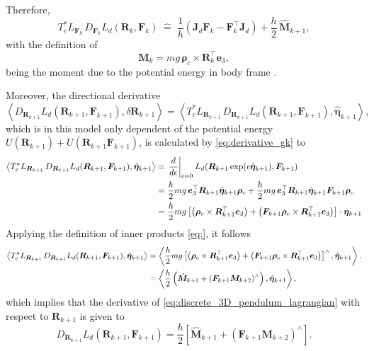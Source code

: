 Therefore,
\begin{equation}\label{eq:discrete_3D_pendulum_derivative_fk}
    T_e^*L_{\bm{F}_k}\,D_{\bm{F}_k}L_d(\bm{R}_k,\bm{F}_k)
    \;\widehat{=}\;
    \frac{1}{h}\left(\bm{J}_d \bm{F}_k - \bm{F}_k^{\top}\bm{J}_d\right)
    +
    \frac{h}{2}\,\hat{\bm{M}}_{k+1},
\end{equation}
    with the definition of
\begin{equation}
    \bm{M}_{k} = mg\,\bm{\rho}_c\times \bm{R}_{k}^{\top}\bm{e}_3,
\end{equation}
being the moment due to the potential energy in body frame \cite{Lee2008}.

Moreover, the directional derivative 
\[
\left\langle
D_{\bm{R}_{k+1}}L_d(\bm{R}_{k+1},\bm{F}_{k+1}),
\delta \bm{R}_{k+1}
\right\rangle = \left\langle
T_e^*L_{\bm{R}_{k+1}}\,D_{\bm{R}_{k+1}}L_d(\bm{R}_{k+1},\bm{F}_{k+1}),
\hat{\bm{\eta}}_{k+1}
\right\rangle,
\] which is in this model only dependent of the potential energy $U(\bm{R}_{k+1})+U(\bm{R}_{k+1} \bm{F}_{k+1})$, is calculated by \eqref{eq:derivative_gk} to
{\small
\begin{align}
\left\langle
T_e^*L_{\bm{R}_{k+1}}\,D_{\bm{R}_{k+1}}L_d(\bm{R}_{k+1},\bm{F}_{k+1}),
\hat{\bm{\eta}}_{k+1}
\right\rangle
\notag
&=
\left.\frac{d}{d\epsilon}\right|_{\epsilon=0}
L_d\!\left(
\bm{R}_{k+1}\exp(\epsilon\hat{\bm{\eta}}_{k+1}),
\bm{F}_{k+1}
\right)
\notag\\
&=
\frac{h}{2}mg\,\bm{e}_3^{\top}\bm{R}_{k+1}\hat{\bm{\eta}}_{k+1}\bm{\rho}_c
+
\frac{h}{2}mg\,\bm{e}_3^{\top}\bm{R}_{k+1}\hat{\bm{\eta}}_{k+1}\bm{F}_{k+1}\bm{\rho}_c
\notag\\
&=
\frac{h}{2}mg
\left[
\left(\bm{\rho}_c\times \bm{R}_{k+1}^{\top}\bm{e}_3\right)
+
\left(\bm{F}_{k+1}\bm{\rho}_c\times \bm{R}_{k+1}^{\top}\bm{e}_3\right)
\right]\cdot \bm{\eta}_{k+1}
\notag
\end{align}}
Applying the definition of inner products \eqref{eq:}, it follows 
{\small
\begin{align}  
 \left\langle
T_e^*L_{\bm{R}_{k+1}}\,D_{\bm{R}_{k+1}}L_d(\bm{R}_{k+1},\bm{F}_{k+1}),
\hat{\bm{\eta}}_{k+1}
\right\rangle
&=
\left\langle
\frac{h}{2}mg
\left[
\left(\bm{\rho}_c\times \bm{R}_{k+1}^{\top}\bm{e}_3\right)
+
\left(\bm{F}_{k+1}\bm{\rho}_c\times \bm{R}_{k+1}^{\top}\bm{e}_3\right)
\right]^\wedge,
\hat{\bm{\eta}}_{k+1}
\right\rangle.
\notag \\
&=
\left\langle
\frac{h}{2}
\left(
\hat{\bm{M}}_{k+1}
+
(\bm{F}_{k+1}\bm{M}_{k+2})^\wedge
\right),
\hat{\bm{\eta}}_{k+1}
\right\rangle,
\notag
\end{align}
}
which implies that the derivative of \eqref{eq:discrete_3D_pendulum_lagrangian} with respect to $\bm{R}_{k+1}$ is given to
\begin{equation}\label{eq:discrete_3D_pendulum_derivative_gk}
    D_{\bm{R}_{k+1}}L_d(\bm{R}_{k+1},\bm{F}_{k+1}) = \frac{h}{2}
\left[
\hat{\bm{M}}_{k+1}
+
(\bm{F}_{k+1}\bm{M}_{k+2})^\wedge
\right].
\end{equation}

